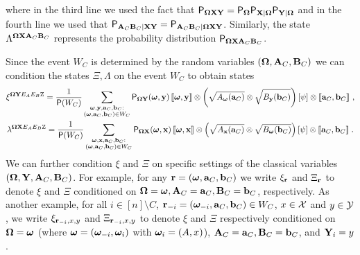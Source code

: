 where in the third line we used the fact that $\P_{\bOmega \bX \bY} = \P_{\bOmega} \P_{\bX | \bOmega} \P_{\bY | \bOmega}$ and in the fourth line we used that $\P_{\bA_C \bB_C | \bX \bY} = \P_{\bA_C \bB_C | \bOmega \bX \bY}$.   Similarly, the state $\Lambda^{\bOmega \bX \bA_C \bB_C}$ represents the probability distribution  $\P_{\bOmega \bX \bA_C \bB_C}$.

Since the event $W_C$ is determined by the random variables $(\bOmega,\bA_C,\bB_C)$ we can {condition} the states $\Xi, \Lambda$ on the event $W_C$ to obtain states
\begin{gather*}
	\xi^{\bOmega \bY E_A E_B \ac} = \frac{1}{\P(W_C)} \sum_{\substack{\bomega, \by, \ba_C, \bb_C: \\ (\bomega,\ba_C,\bb_C) \in W_C}} \P_{\bOmega \bY}(\bomega, \by) \, \puretomixed{\bomega, \by} \otimes \left (\sqrt{A_{\bomega}(\ba_C)} \otimes \sqrt{B_{\by}(\bb_C)} \right ) \left [\psi \right ] \otimes \puretomixed{\ba_C,\bb_C}~, \\
	\lambda^{\bOmega \bX E_A E_B \ac} = \frac{1}{\P(W_C)} \sum_{\substack{\bomega, \bx, \ba_C, \bb_C: \\ (\bomega,\ba_C,\bb_C) \in W_C}} \P_{\bOmega \bX}(\bomega, \bx) \, \puretomixed{\bomega, \bx} \otimes \left (\sqrt{A_{\bx}(\ba_C)} \otimes \sqrt{B_{\bomega}(\bb_C)} \right ) \left [\psi \right ] \otimes \puretomixed{\ba_C,\bb_C}\;.
\end{gather*}
We can further condition $\xi$ and $\Xi$ on specific settings of the classical variables $(\bOmega,\bY,\bA_C,\bB_C)$. For example, for any $\br = (\bomega,\ba_C,\bb_C)$ we write $\xi_\br$ and $\Xi_\br$ to denote $\xi$ and $\Xi$ conditioned on $\bOmega = \bomega, \bA_C = \ba_C,\bB_C = \bb_C$, respectively. As another example, for all $i \in [n] \setminus C$, $\br_\mi = (\bomega_\mi,\ba_C,\bb_C) \in W_C$, $x \in \X$ and $y \in \Y$, we write $\xi_{\br_\mi,x,y}$ and $\Xi_{\br_\mi,x,y}$ to denote $\xi$ and $\Xi$ respectively conditioned on $\bOmega = \bomega$ (where $\bomega = (\bomega_\mi,\bomega_i)$ with $\bomega_i = (A,x)$),  $\bA_C = \ba_C, \bB_C = \bb_C$, and $\bY_i = y$.

